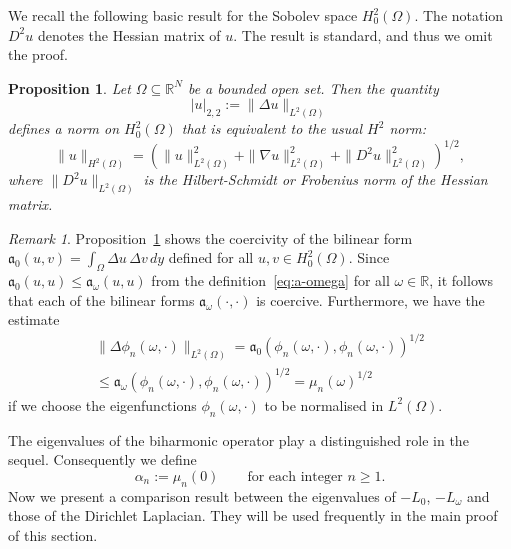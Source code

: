 \documentclass[a4paper, reqno,titlepage]{amsart}
\numberwithin{equation}{section}
\theoremstyle{plain}
\newtheorem{proposition}[theorem]{Proposition}
\theoremstyle{definition}
\theoremstyle{remark}
\newtheorem{remark}[theorem]{Remark}
\newcommand{\mfra}{\mathfrak{a}}
\newcommand{\RR}{\mathbb{R}}
\begin{document}
We recall the following basic result for the Sobolev space $H^2_0(\Omega)$. The notation $D^2 u$ denotes the Hessian matrix of $u$. The result is standard, and thus we omit the proof.
\begin{proposition}
  \label{prop:H22-norm}
  Let $\Omega \subseteq \RR^N$ be a bounded open set. Then the quantity
  \begin{equation*}
    |u|_{2,2} := \|\Delta u\|_{L^2(\Omega)}
  \end{equation*}
  defines a norm on $H^2_0(\Omega)$ that is equivalent to the usual $H^2$ norm:
  \begin{equation*}
    \|u\|_{H^2(\Omega)} = \left(\|u\|^2_{L^2(\Omega)} + \|\nabla u\|^2_{L^2(\Omega)} + \|D^2 u\|^2_{L^2(\Omega)} \right)^{1/2},
  \end{equation*}
  where $\|D^2u\|_{L^2(\Omega)}$ is the Hilbert-Schmidt or Frobenius norm of the Hessian matrix.
\end{proposition}

\begin{remark}
  \label{rmk:quad}
  Proposition~\ref{prop:H22-norm} shows the coercivity of the bilinear form $\mfra_0(u,v) = \int_\Omega \Delta u \, \Delta v \,dy$ defined for all $u, v \in H^2_0(\Omega)$. Since $\mfra_0(u,u) \leq \mfra_{\omega}(u,u)$ from the definition~\eqref{eq:a-omega} for all $\omega \in \RR$, it follows that each of the bilinear forms $\mfra_\omega(\cdot,\cdot)$ is coercive. Furthermore, we have the estimate
  \begin{multline}
    \label{eq:D2phi-estimate}
    \| \Delta \phi_n(\omega, \cdot) \|_{L^2(\Omega)}
    = \mfra_0(\phi_n(\omega, \cdot), \phi_n(\omega, \cdot))^{1/2}\\
    \leq \mfra_\omega(\phi_n(\omega, \cdot), \phi_n(\omega, \cdot))^{1/2}
    = \mu_n(\omega)^{1/2}
  \end{multline}
  if we choose the eigenfunctions $\phi_n(\omega,\cdot)$ to be normalised in $L^2(\Omega)$.
\end{remark}

The eigenvalues of the biharmonic operator play a distinguished role in the sequel. Consequently we define
\begin{equation*}
  \alpha_n := \mu_n(0) \qquad \text{for each integer } n \ge 1.
\end{equation*}
Now we present a comparison result between the eigenvalues of $-L_0$, $-L_\omega$ and those of the Dirichlet Laplacian. They will be used frequently in the main proof of this section.
\end{document}

